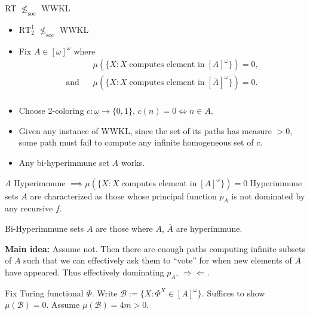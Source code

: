 \begin{frame}{RT $\nleq_{\text{soc}}$ WWKL}
  \begin{itemize}
    \item $\text{RT}_2^1$ $\nleq_{\text{soc}}$ WWKL
    \item Fix $A\in[\omega]^\omega$ where
      \begin{align*}
        &\mu(\{X: X\; \text{computes element in}\; [A]^\omega\}) =0,\\
        \text{and}\;\;\; &\mu(\{X: X\; \text{computes element in}\;
        [\bar{A}]^\omega\}) =0.\\
      \end{align*}
    \item Choose 2-coloring $c:\omega\rightarrow\{0,1\}$, $c(n)=0
      \Leftrightarrow n\in A$.
    \item Given any instance of WWKL, since the set of its paths has
      measure $>0$, some path must fail to compute any infinite
      homogeneous set of $c$. 
    \item Any bi-hyperimmune set $A$ works.
  \end{itemize}
\end{frame}

\begin{frame}{$A$ Hyperimmune $\implies \mu(\{X: X\; \text{computes
element in}\; [A]^\omega\}) =0$}
  Hyperimmune sets $A$ are characterized as those whose principal
  function $p_A$ is not dominated by any recursive $f$. \\
  \vspace{1em}

  Bi-Hyperimmune sets $A$ are those where $A$, $\bar{A}$ are hyperimmune.\\
  \vspace{1em}

  \textbf{Main idea:} Assume not. Then there are enough paths computing
  infinite subsets of $A$ such that we can effectively ask them to ``vote''
  for when new elements of $A$ have appeared. Thus effectively dominating
  $p_A$, $\Rightarrow\Leftarrow$.\\
  \vspace{1em}

  Fix Turing functional $\Phi$. Write $\mathcal{B} :=\{X:
  \Phi^X\in[A]^\omega\}$. Suffices to show $\mu(\mathcal{B})=0$. Assume
  $\mu(\mathcal{B})=4m>0$.
\end{frame}

